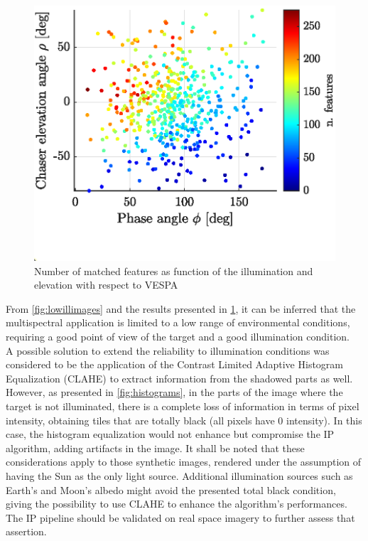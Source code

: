 \begin{figure}[!h]
    \centering
    \includegraphics[clip, trim = 0cm 1cm 0cm 1cm, width = 0.5\linewidth]{Images/suninclcorr.eps}
    \caption[Feature detection dependability on $\rho$ and $\phi$]{Number of matched features as function of the illumination and elevation with respect to VESPA}
    \label{fig:illelcorr}
\end{figure}
From \cref{fig:lowillimages} and the results presented in \cref{fig:illelcorr}, it can be inferred that the multispectral application is limited to a low range of environmental conditions, requiring a good point of view of the target and a good illumination condition.\\
A possible solution to extend the reliability to illumination conditions was considered to be the application of the Contrast Limited Adaptive Histogram Equalization (CLAHE) to extract information from the shadowed parts as well. However, as presented in \cref{fig:histograms}, in the parts of the image where the target is not illuminated, there is a complete loss of information in terms of pixel intensity, obtaining tiles that are totally black (all pixels have 0 intensity). In this case, the histogram equalization would not enhance but compromise the IP algorithm, adding artifacts in the image. It shall be noted that these considerations apply to those synthetic images, rendered under the assumption of having the Sun as the only light source. Additional illumination sources such as Earth's and Moon's albedo might avoid the presented total black condition, giving the possibility to use CLAHE to enhance the algorithm's performances.\\
The IP pipeline should be validated on real space imagery to further assess that assertion.\\ 

